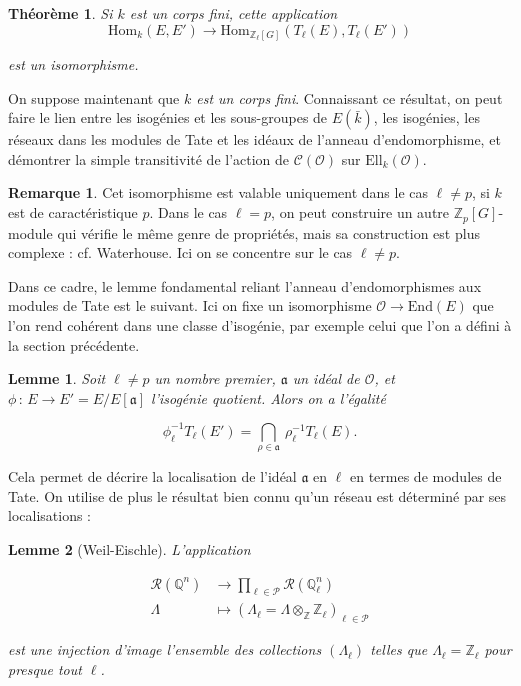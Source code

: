 \documentclass[11pt,a4paper]{article}
\newcommand{\Z}{\mathbb{Z}}
\newcommand{\Q}{\mathbb{Q}}
\renewcommand{\O}{\mathcal{O}}
\newcommand{\Cl}{\mathcal{C}}
\newcommand{\vers}{\longrightarrow}
\newcommand{\End}{\mathrm{End}}
\newcommand{\Hom}{\mathrm{Hom}}
\newcommand{\Ell}{\mathrm{Ell}}
\renewcommand{\frak}{\mathfrak}
\newcommand{\de}{\,:\,}
\newtheorem*{thm}{Théorème}
\newtheorem*{lem}{Lemme}
\theoremstyle{definition}
\newtheorem*{rem}{Remarque}
\begin{document}
\begin{thm} Si $k$ est un corps fini, cette application
$$\Hom_k(E, E') \vers \Hom_{\Z_\ell[G]} (T_\ell(E), T_\ell(E'))$$

est un isomorphisme.
\end{thm}

On suppose maintenant que \emph{$k$ est un corps fini}. Connaissant ce résultat, on peut faire le lien entre les isogénies et les sous-groupes de $E(\bar{k})$, les isogénies, les réseaux dans les modules de Tate et les idéaux de l'anneau d'endomorphisme, et démontrer la simple transitivité de l'action de $\Cl(\O)$ sur $\Ell_k(\O)$.

\begin{rem}

Cet isomorphisme est valable uniquement dans le cas $\ell\neq p$, si $k$ est de caractéristique $p$. Dans le cas $\ell=p$, on peut construire un autre $\Z_p[G]$-module qui vérifie le même genre de propriétés, mais sa construction est plus complexe : cf. Waterhouse. Ici on se concentre sur le cas $\ell\neq p$.

\end{rem}

Dans ce cadre, le lemme fondamental reliant l'anneau d'endomorphismes aux modules de Tate est le suivant. Ici on fixe un isomorphisme $\O\vers \End(E)$ que l'on rend cohérent dans une classe d'isogénie, par exemple celui que l'on a défini à la section précédente.

\begin{lem}

Soit $\ell\neq p$ un nombre premier, $\frak a$ un idéal de $\O$, et $\phi\de E\vers E' = E/E[\frak a]$ l'isogénie quotient. Alors on a l'égalité

$$\phi_\ell^{-1} T_\ell(E') = \bigcap_{\rho\in\frak a}\ \rho_\ell^{-1} T_\ell(E) .$$
\end{lem}

Cela permet de décrire la localisation de l'idéal $\frak a$ en $\ell$ en termes de modules de Tate. On utilise de plus le résultat bien connu qu'un réseau est déterminé par ses localisations :

\begin{lem}[Weil-Eischle] L'application

$$\begin{aligned}
\mathcal{R}(\Q^n) &\longrightarrow \prod_{\ell\in \mathcal{P}} \mathcal{R}(\Q_\ell^n) \\
\Lambda\ \ &\longmapsto (\Lambda_\ell = \Lambda\otimes_\Z \Z_\ell)_{\ell\in\mathcal{P}}
\end{aligned}$$

est une injection d'image l'ensemble des collections $(\Lambda_\ell)$ telles que $\Lambda_\ell = \Z_\ell$ pour presque tout $\ell$.
\end{lem}
\end{document}
